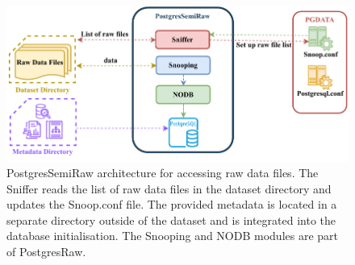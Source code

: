 \begin{figure}[h!]
\centering
\includegraphics[width=1.0\linewidth]{img/pgSemiRaw-sniffer.pdf}
\caption[PostgresSemiRaw architecture for accessing raw data files.]{PostgresSemiRaw architecture for accessing raw data files. The Sniffer reads the list of raw data files in the dataset directory and updates the Snoop.conf file. The provided metadata is located in a separate directory outside of the dataset and is integrated into the database initialisation. The Snooping and NODB modules are part of PostgresRaw.}
\label{fig:pgSemiraw-sniffer}
\end{figure}